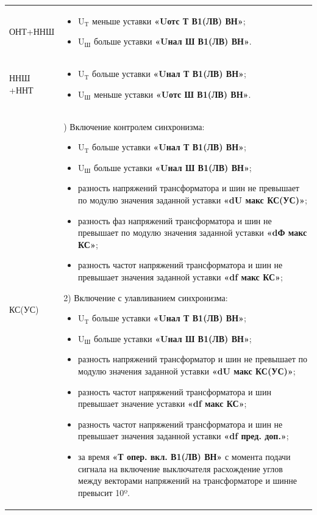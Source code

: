 \begin{enumerate}[label=\arabic{section}.\arabic{subsection}.\arabic{subsubsection}.\arabic*,  align=left, labelsep=4pt, leftmargin=0pt, itemindent=57pt]
\begin{longtable}{|>{\centering\arraybackslash}m{5.3cm}|>{\centering\arraybackslash}m{11.6cm}|}
ОНТ+ННШ &   \vspace{5pt}
			\begin{itemize}
			\item $ \textrm{U}_\textrm{T} $ меньше уставки \textbf{«Uотс Т В1(ЛВ) ВН»};
			\item $ \textrm{U}_\textrm{Ш} $ больше уставки \textbf{«Uнал Ш В1(ЛВ) ВН»}.
			\end{itemize} \\
			\vspace{10pt}
\hline
ННШ +ННТ & 
			\begin{itemize}
			\item $ \textrm{U}_\textrm{T} $ больше уставки \textbf{«Uнал Т В1(ЛВ) ВН»};
			\item $ \textrm{U}_\textrm{Ш} $ меньше уставки \textbf{«Uотс Ш В1(ЛВ) ВН»}.
			\end{itemize} \\
\hline
КС(УС)	&
			1) Включение контролем синхронизма: 
			\begin{itemize}
			\item $ \textrm{U}_\textrm{T} $ больше уставки \textbf{«Uнал Т В1(ЛВ) ВН»};
			\item $ \textrm{U}_\textrm{Ш} $ больше уставки \textbf{«Uнал Ш В1(ЛВ) ВН»};
			\item разность напряжений трансформатора и шин не превышает по модулю значения заданной уставки \textbf{«dU макс КС(УС)»};
			\item разность фаз напряжений трансформатора и шин не превышает по модулю значения заданной уставки \textbf{«dФ макс КС»};
			\item разность частот напряжений трансформатора и шин не превышает значения заданной уставки \textbf{«df макс КС»};
			\end{itemize}
			
			2) Включение с улавливанием синхронизма: 
			\begin{itemize}
			\item $ \textrm{U}_\textrm{T} $ больше уставки \textbf{«Uнал Т В1(ЛВ) ВН»};
			\item $ \textrm{U}_\textrm{Ш} $ больше уставки \textbf{«Uнал Ш В1(ЛВ) ВН»};
			\item разность напряжений трансформатор и шин не превышает по модулю значения заданной уставки \textbf{«dU макс КС(УС)»};
			\item разность частот напряжений трансформатора и шин превышает значение уставки \textbf{«df макс КС»};
			\item разность частот напряжений трансформатора и шин не превышает значения заданной уставки \textbf{«df пред. доп.»};
			\item за время \textbf{«Т опер. вкл. В1(ЛВ) ВН»} с момента подачи сигнала на включение выключателя расхождение углов между векторами напряжений на трансформаторе и шинне превысит 10º.
			\end{itemize} \\
\hline


\end{longtable}
\end{enumerate}
